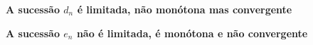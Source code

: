 \documentclass[20pt, a4paper]{extarticle}
\begin{document}
\begin{questoes}
\begin{center}
	\label{fig:dn}
\end{center}
\centering \textbf{A sucessão $d_{n}$ é limitada, não monótona mas convergente}

\begin{center}
	\label{fig:en}
\end{center}
\centering \textbf{A sucessão $e_{n}$ não é limitada, é monótona e não convergente}


\end{questoes}
\end{document}
